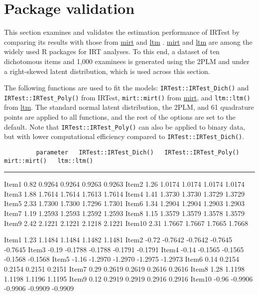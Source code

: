 \hypertarget{package-validation}{%
\section{Package validation}\label{package-validation}}

This section examines and validates the estimation performance of IRTest
by comparing its results with those from
\href{https://CRAN.R-project.org/package=mirt}{mirt} \citep{mirt} and
\href{https://CRAN.R-project.org/package=ltm}{ltm} \citep{ltm}.
\href{https://CRAN.R-project.org/package=mirt}{mirt} and
\href{https://CRAN.R-project.org/package=ltm}{ltm} are among the widely used
R packages for IRT analyses. To this end, a dataset of ten dichotomous
items and 1,000 examinees is generated using the 2PLM and under a
right-skewed latent distribution, which is used across this section.

The following functions are used to fit the models:
\texttt{IRTest::IRTest\_Dich()} and \texttt{IRTest::IRTest\_Poly()} from IRTest,
\texttt{mirt::mirt()} from \href{https://CRAN.R-project.org/package=mirt}{mirt}, and
\texttt{ltm::ltm()} from \href{https://CRAN.R-project.org/package=ltm}{ltm}. The
standard normal latent distribution, the 2PLM, and 61 quadrature points
are applied to all functions, and the rest of the options are set to the
default. Note that \texttt{IRTest::IRTest\_Poly()} can also be applied to binary
data, but with lower computational efficiency compared to
\texttt{IRTest::IRTest\_Dich()}.

\hypertarget{tab:parameter-static}{}
\begin{verbatim}
         parameter   IRTest::IRTest_Dich()   IRTest::IRTest_Poly()   mirt::mirt()   ltm::ltm()
\end{verbatim}

\begin{center}\rule{0.5\linewidth}{0.5pt}\end{center}

Item1 0.82 0.9264 0.9264 0.9263 0.9263
Item2 1.26 1.0174 1.0174 1.0174 1.0174
Item3 1.88 1.7614 1.7614 1.7613 1.7614
Item4 1.41 1.3730 1.3730 1.3729 1.3729
Item5 2.33 1.7300 1.7300 1.7296 1.7301
Item6 1.34 1.2904 1.2904 1.2903 1.2903
Item7 1.19 1.2593 1.2593 1.2592 1.2593
Item8 1.15 1.3579 1.3579 1.3578 1.3579
Item9 2.42 2.1221 2.1221 2.1218 2.1221
Item10 2.31 1.7667 1.7667 1.7665 1.7668

Item1 1.23 1.1484 1.1484 1.1482 1.1481
Item2 -0.72 -0.7642 -0.7642 -0.7645 -0.7645
Item3 -0.19 -0.1788 -0.1788 -0.1791 -0.1791
Item4 -0.14 -0.1565 -0.1565 -0.1568 -0.1568
Item5 -1.16 -1.2970 -1.2970 -1.2975 -1.2973
Item6 0.14 0.2154 0.2154 0.2151 0.2151
Item7 0.29 0.2619 0.2619 0.2616 0.2616
Item8 1.28 1.1198 1.1198 1.1196 1.1195
Item9 0.12 0.2919 0.2919 0.2916 0.2916
Item10 -0.96 -0.9906 -0.9906 -0.9909 -0.9909

